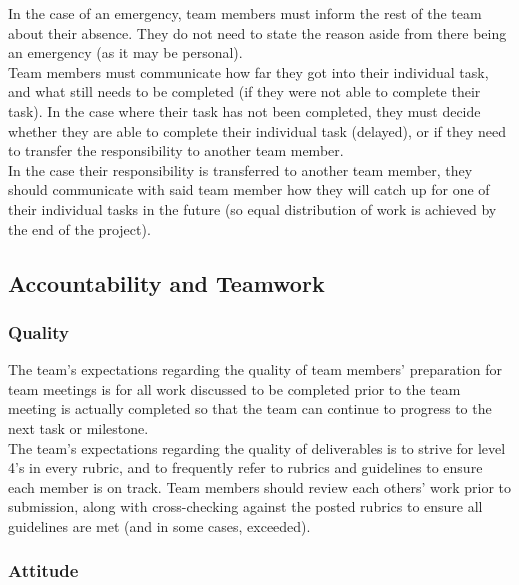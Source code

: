 \documentclass{article}
\begin{document}
In the case of an emergency, team members must inform the rest of the team about their absence.
They do not need to state the reason aside from there being an emergency (as it may be personal).\\
\indent Team members must communicate how far they got into their individual task, and what still needs to be completed
(if they were not able to complete their task). In the case where their task has not been completed, they must
decide whether they are able to complete their individual task (delayed), or if they need to transfer
the responsibility to another team member.\\
\indent In the case their responsibility is transferred to another team member, they should communicate with said
team member how they will catch up for one of their individual tasks in the future (so equal distribution
of work is achieved by the end of the project).

\subsection*{Accountability and Teamwork}

\subsubsection*{Quality} 

The team's expectations regarding the quality of team members' preparation for team meetings
is for all work discussed to be completed prior to the team meeting is actually completed so
that the team can continue to progress to the next task or milestone.\\
\indent The team's expectations regarding the quality of deliverables is to strive for level
4's in every rubric, and to frequently refer to rubrics and guidelines to ensure each member
is on track. Team members should review each others' work prior to submission, along with
cross-checking against the posted rubrics to ensure all guidelines are met
(and in some cases, exceeded).


\subsubsection*{Attitude}
\end{document}
